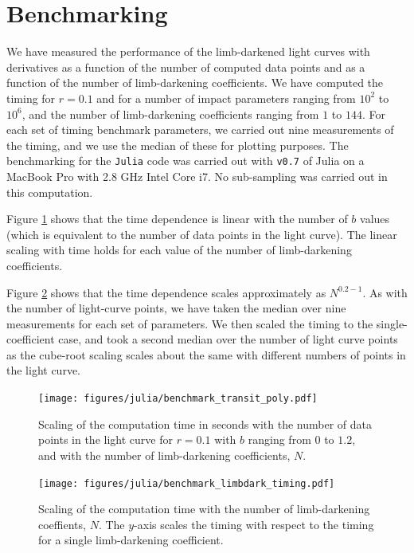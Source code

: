 \documentclass[modern]{aastex61}
\begin{document}
\section{Benchmarking}\label{sec:benchmark}

We have measured the performance of the limb-darkened light curves
with derivatives as a function of the number of computed data points
and as a function of the number of limb-darkening coefficients.  We
have computed the timing for $r=0.1$ and for a number of impact
parameters ranging from $10^2$ to $10^6$, and the number of limb-darkening
coefficients ranging from $1$ to $144$.  For each set of timing benchmark
parameters, we carried out nine measurements  of the timing, and
we use the median of these for plotting purposes.  The benchmarking
for the \texttt{Julia} code was carried out with \texttt{v0.7} of
Julia on a MacBook Pro with 2.8 GHz Intel Core i7.
No sub-sampling was carried out in this computation.

Figure \ref{fig:ncoeff} shows that the time dependence is linear with the
number of $b$ values (which is equivalent to the number of data points
in the light curve).  The linear scaling with time holds for each value of
the number of limb-darkening coefficients.

Figure \ref{fig:nlimb} shows that the time dependence scales approximately
as $N^{0.2-1}$.  As with the number of light-curve points, we have taken
the median over nine measurements for each set of parameters.  We then
scaled the timing to the single-coefficient case, and took a second
median over the number of light curve points as the cube-root scaling scales
about the same with different numbers of points in the light curve.

\begin{figure}
    \begin{centering}
    \texttt{[image: figures/julia/benchmark\_transit\_poly.pdf]}
    \caption{Scaling of the computation time in seconds with the number of
    data points in the light curve for $r=0.1$ with $b$ ranging from $0$ to $1.2$,
    and with the number of limb-darkening coefficients, $N$. }
    \label{fig:ncoeff}
    \end{centering}
\end{figure}

\begin{figure}
    \begin{centering}
    \texttt{[image: figures/julia/benchmark\_limbdark\_timing.pdf]}
    \caption{Scaling of the computation time with the number of
    limb-darkening coeffients, $N$.  The $y$-axis scales the timing with respect
    to the timing for a single limb-darkening coefficient. }
    \label{fig:nlimb}
    \end{centering}
\end{figure}
\end{document}
